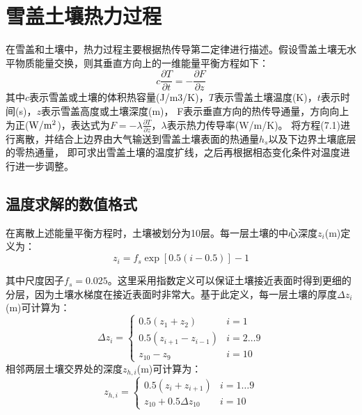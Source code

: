 \chapter{雪盖土壤热力过程}


在雪盖和土壤中，热力过程主要根据热传导第二定律进行描述。假设雪盖土壤无水平物质能量交换，则其垂直方向上的一维能量平衡方程如下：
\begin{equation}
c \frac{\partial T}{\partial t}=-\frac{\partial F}{\partial z}
\end{equation}
其中$c$表示雪盖或土壤的体积热容量(J/m3/K)，$T$表示雪盖土壤温度(K)，$t$表示时间(s)，$z$表示雪盖高度或土壤深度(m)，
F表示垂直方向的热传导通量，方向向上为正($\rm W/m^2$)，表达式为$F=-\lambda\frac{\partial T}{\partial z}$，$\lambda$表示热力传导率(W/m/K)。
将方程(7.1)进行离散，并结合上边界由大气输送到雪盖土壤表面的热通量$h_s$以及下边界土壤底层的零热通量，
即可求出雪盖土壤的温度扩线，之后再根据相态变化条件对温度进行进一步调整。
\section{温度求解的数值格式}\label{温度求解的数值格式}
在离散上述能量平衡方程时，土壤被划分为10层。每一层土壤的中心深度$z_i$(m)定义为：
\begin{equation}
z_{i}=f_{s} \exp [0.5(i-0.5)]-1
\end{equation}

其中尺度因子$f_s=0.025$。这里采用指数定义可以保证土壤接近表面时得到更细的分层，因为土壤水梯度在接近表面时非常大。基于此定义，每一层土壤的厚度$\Delta z_i$(m)可计算为：
\begin{equation}
\Delta z_{i}=\left\{\begin{array}{lr}0.5\left(z_{1}+z_{2}\right) & i=1 \\ 0.5\left(z_{i+1}-z_{i-1}\right) & i=2 \ldots 9 \\ z_{10}-z_{9} & i=10\end{array}\right.
\end{equation}
相邻两层土壤交界处的深度$z_{h,i}$(m)可计算为：
\begin{equation}
z_{h, i}=\left\{\begin{array}{lr}0.5\left(z_{i}+z_{i+1}\right) & i=1 \ldots 9 \\ z_{10}+0.5 \Delta z_{10} & i=10\end{array}\right.
\end{equation}


